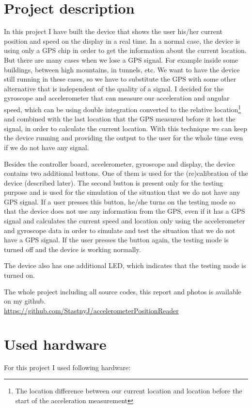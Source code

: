 \documentclass[hidelinks,a4paper]{article}
\begin{document}
\section{Project description}
In this project I have built the device that shows the user his/her current position and speed on the display in a real time. In a normal case, the device is using only a GPS chip in order to get the information about the current location. But there are many cases when we lose a GPS signal. For example inside some buildings, between high mountains, in tunnels, etc. We want to have the device still running in these cases, so we have to substitute the GPS with some other alternative that is independent of the quality of a signal. I decided for the gyroscope and accelerometer that can measure our acceleration and angular speed, which can be using double integration converted to the relative location\footnote{The location difference between our current location and location before the start of the acceleration measurement} and combined with the last location that the GPS measured before it lost the signal, in order to calculate the current location. With this technique we can keep the device running and providing the output to the user for the whole time even if we do not have any signal.\par
Besides the controller board, accelerometer, gyroscope and display, the device contains two additional buttons. One of them is used for the (re)calibration of the device (described later). The second button is present only for the testing purpose and is used for the simulation of the situation that we do not have any GPS signal. If a user presses this button, he/she turns on the testing mode so that the device does not use any information from the GPS, even if it has a GPS signal and calculates the current speed and location only using the accelerometer and gyroscope data in order to simulate and test the situation that we do not have a GPS signal. If the user presses the button again, the testing mode is turned off and the device is working normally.\par
The device also has one additional LED, which indicates that the testing mode is turned on.\\\par
The whole project including all source codes, this report and photos is available on my github.\\
\url{https://github.com/StastnyJ/accelerometerPositionReader}

\section{Used hardware}
For this project I used following hardware:
\end{document}
